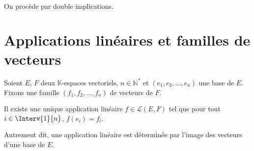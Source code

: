 \documentclass[a4paper,10pt]{report}
\begin{document}
\begin{preuve} On procède par double implications.
%
%
%
%

\vspace{6cm}
\end{preuve}

\section{Applications linéaires et familles de vecteurs}

\begin{prop} Soient $E$, $F$ deux $\mathbb{K}$-espaces vectoriels, $n \in \mathbb{N}^*$ et $(e_1, e_2, \ldots, e_n)$ une base de $E$. Fixons une famille $(f_1, f_2, \ldots, f_n)$ de vecteurs de $F$. 

\noindent Il existe une unique application linéaire $f \in \mathcal{L}(E,F)$ tel que pour tout $i \in \Interv{1}{n}$, $f(e_i)=f_i$.

\noindent Autrement dit, une application linéaire est déterminée par l'image des vecteurs d'une base de $E$.
\end{prop}

%
\end{document}
